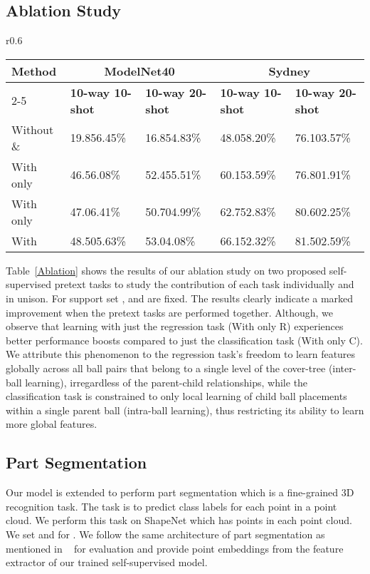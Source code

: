 \documentclass{article}
\begin{document}
\subsection{Ablation Study}
\begin{wraptable}{r}{0.6\linewidth}
	\caption{Ablation study (accuracy \%) on ModelNet40 and Sydney datasets for DGCNN with random init (without / ) and pre-trained with our self-supervised tasks  and .}
	\label{Ablation}
	\centering
	\tiny
	\setlength{\tabcolsep}{4.5pt}
	\begin{tabular}{lllll}
		\toprule
		Method & \multicolumn{2}{c}{ModelNet40}  &  \multicolumn{2}{c}{Sydney}\\
		\cmidrule(r){2-5}
		& \textbf{10-way 10-shot} & \textbf{10-way 20-shot}  & \textbf{10-way 10-shot} & \textbf{10-way 20-shot}\\
		\midrule
		
Without \& & 19.856.45\% & 16.854.83\% & 48.058.20\%  & 76.103.57\% \\
		With only  & 46.56.08\% & 52.455.51\% &  60.153.59\% & 76.801.91\%\\
		With only  & 47.06.41\% & 50.704.99\% & 62.752.83\% & 80.602.25\%\\
		With & 48.505.63\% & 53.04.08\% & 66.152.32\% & 81.502.59\%\\
		\bottomrule
	\end{tabular}
\end{wraptable}
Table~\ref{Ablation} shows the results of our ablation study on two proposed self-supervised pretext tasks to study the contribution of each task individually and in unison. 
For support set ,  and  are fixed. 
The results clearly indicate a marked improvement when the pretext tasks are performed together. 
Although, we observe that learning with just the regression task (With only R) experiences better performance boosts compared to just the classification task (With only C). We attribute this phenomenon to the regression task's freedom to learn features globally across all ball pairs that belong to a single level of the cover-tree  (inter-ball learning), irregardless of the parent-child relationships, while the classification task is constrained to only local learning of child ball placements within a single parent ball (intra-ball learning), thus restricting its ability to learn more global features.

\subsection{Part Segmentation}
Our model is extended to perform part segmentation which is a fine-grained 3D recognition task. The task is to predict class labels for each point in a point cloud. We perform this task on ShapeNet which has  points in each point cloud. We set  and  for . We follow the same architecture of part segmentation as mentioned in ~\cite{dgcnn} for evaluation and provide point embeddings from the feature extractor of our trained self-supervised model.
\end{document}
